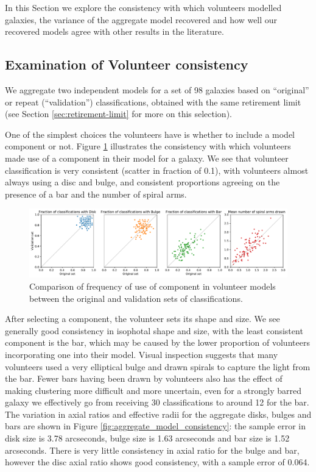 \documentclass[../main.tex]{subfiles}
\begin{document}
\label{sec:results}

In this Section we explore the consistency with which volunteers modelled galaxies, the variance of the aggregate model recovered and how well our recovered models agree with other results in the literature.


\subsection{Examination of Volunteer consistency}
We aggregate two independent models for a set of 98 galaxies based on ``original'' or repeat (``validation'') classifications, obtained with the same retirement limit (see Section \ref{sec:retirement-limit} for more on this selection).

One of the simplest choices the volunteers have is whether to include a model component or not. Figure \ref{fig:volunteer_component_consistency} illustrates the consistency with which volunteers made use of a component in their model for a galaxy. We see that volunteer classification is very consistent (scatter in fraction of 0.1), with volunteers almost always using a disc and bulge, and consistent proportions agreeing on the presence of a bar and the number of spiral arms.

\begin{figure}
  \includegraphics[width=17.3cm]{images__results/component_frequency.pdf}
  \caption{Comparison of frequency of use of component in volunteer models between the original and validation sets of classifications.}
  \label{fig:volunteer_component_consistency}
\end{figure}

After selecting a component, the volunteer sets its shape and size. We see generally good consistency in isophotal shape and size, with the least consistent component is the bar, which may be caused by the lower proportion of volunteers incorporating one into their model. Visual inspection suggests that many volunteers used a very elliptical bulge and drawn spirals to capture the light from the bar. Fewer bars having been drawn by volunteers also has the effect of making clustering more difficult and more uncertain, even for a strongly barred galaxy we effectively go from receiving 30 classifications to around 12 for the bar. The variation in axial ratios and effective radii for the aggregate disks, bulges and bars are shown in Figure \ref{fig:aggregate_model_consistency}: the sample error in disk size is 3.78 arcseconds, bulge size is 1.63 arcseconds and bar size is 1.52 arcseconds. There is very little consistency in axial ratio for the bulge and bar, however the disc axial ratio shows good consistency, with a sample error of 0.064.
\end{document}
